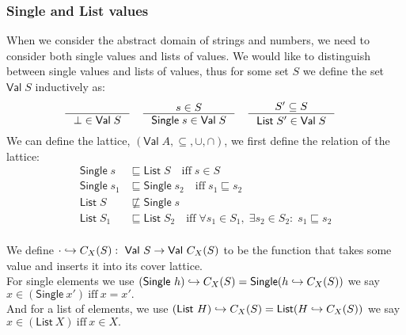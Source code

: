\subsubsection{Single and List values}
When we consider the abstract domain of strings and numbers, we need to consider both single values and lists of values.
We would like to distinguish between single values and lists of values, thus for some set $S$ we define the set $\mathsf{Val} \; S$ inductively as:
\begin{align}
    \inference{}{\bot \in \mathsf{Val} \; S} \quad
    \inference{s \in S}{\mathsf{Single} \; s \in \mathsf{Val} \; S} \quad
    \inference{S' \subseteq S}{\mathsf{List} \; S' \in \mathsf{Val} \; S} \quad
\end{align}
We can define the lattice, $(\mathsf{Val} \; A, \subseteq, \cup, \cap)$, we first define the relation of the lattice:
\begin{align}
    \mathsf{Single} \; s &\sqsubseteq \mathsf{List} \; S \quad
    \text{iff} \; s \in S \\
    \mathsf{Single} \; s_1 &\sqsubseteq \mathsf{Single} \; s_2 \quad
    \text{iff} \; s_1 \sqsubseteq s_2 \\
    \mathsf{List} \; S &\not\sqsubseteq \mathsf{Single} \; s\\
    \mathsf{List} \; S_1 &\sqsubseteq \mathsf{List} \; S_2 \quad
    \text{iff} \; \forall s_1 \in S_1, \; \exists s_2 \in S_2: \; s_1 \sqsubseteq s_2\\
\end{align}

    We define $\cdot \into C_X(S): \ \mathsf{Val} \ S \rightarrow \mathsf{Val} \ C_X(S)$ to be the function that takes some value and inserts it into its cover lattice. \\
    For single elements we use $(\mathsf{Single} \ h) \into C_X(S) = \mathsf{Single}(h\into C_X(S)) \\$
    we say $x \in (\mathsf{Single} \ x') \ \text{iff} \ x = x'.$ \\
    And for a list of elements, we use $(\mathsf{List} \ H) \hookrightarrow C_X(S)=\mathsf{List}(H\hookrightarrow C_X(S))\\$
    we say $x \in (\mathsf{List} \ X) \ \text{iff} \ x \in X.$

